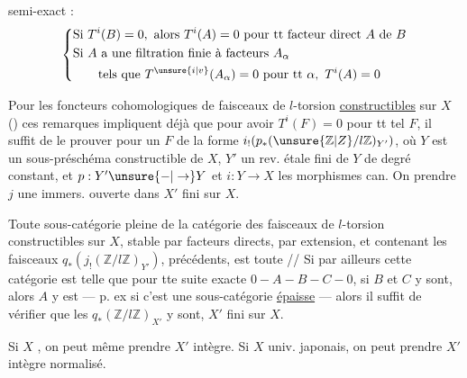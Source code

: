semi-exact :
\[
\left\{\begin{aligned}
 &\text{Si }T^i(B)=0,\ \text{alors }T^i(A)=0\ \text{pour tt facteur direct }A\text{ de }B\\
 &\text{Si } A\text{ a une filtration finie à facteurs }A_\alpha\\
 &\qquad\text{tels que }T^{\unsure{i|v}}(A_\alpha)=0\ \text{pour tt }\alpha,\ T^i(A)=0
\end{aligned}\right.
\]

Pour les foncteurs cohomologiques de faisceaux de $l$-torsion \uline{constructibles} sur $X$ () ces remarques  impliquent déjà que pour avoir $T^i(F)=0$ pour tt tel $F$, il suffit de le prouver pour un $F$ de la forme $i_!(p_*(\unsure{\mathbb Z|Z}/l\mathbb Z)_{Y'})$, où $Y$ est un sous-préschéma constructible de $X$, $Y'$ un rev. étale fini de $Y$ de degré constant, et $p:Y'\unsure{\mathord{-}|\to}Y$ et $i:Y\to X$ les morphismes can. On  prendre $j$ une immers. ouverte dans $X'$ fini sur $X$.


Toute sous-catégorie pleine de la catégorie des faisceaux de $l$-torsion constructibles sur $X$, stable par facteurs directs, par extension, et contenant les faisceaux $q_*(j_!(\mathbb Z/l\mathbb Z)_{Y'})$, précédents, est toute // Si par ailleurs cette catégorie est  telle que pour tte suite exacte $0-A-B-C-0$, si $B$ et $C$ y sont, alors $A$ y est --- p. ex si c'est une sous-catégorie \uline{épaisse} --- alors il suffit de vérifier que les $q_*(\mathbb Z/l\mathbb Z)_{X'}$ y sont, $X'$ fini sur $X$.

Si $X$ , on peut même  prendre $X'$ intègre. Si $X$   univ. japonais, on peut prendre $X'$ intègre normalisé.


